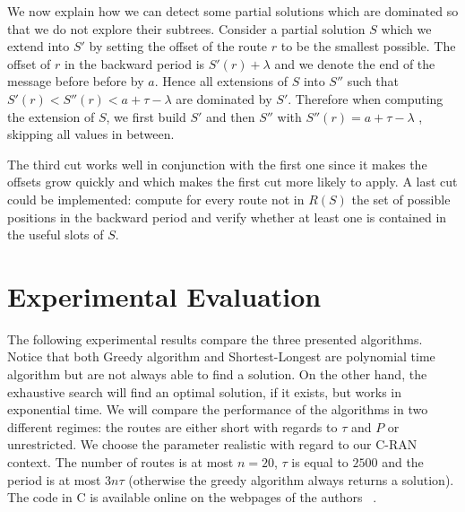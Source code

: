 \documentclass[a4paper,10pt]{article}
\newcommand{\todo}[1]{{\color{red} TODO: {#1}}}
\begin{document}
\begin{enumerate}
       We now explain how we can detect some partial solutions which are dominated so that we do not explore their subtrees.
       Consider a partial solution $S$ which we extend into $S'$ by setting the offset of the route $r$ to be the smallest possible. The offset of $r$ in the backward period is $S'(r)+ \lambda$ and we denote the end of the message before before by $a$. Hence all extensions of $S$ into $S''$ such that $S'(r)  < S''(r) < a + \tau - \lambda$ are dominated by $S'$. Therefore when computing the extension of $S$, we first build $S'$ and then $S''$ with $S''(r) =  a + \tau - \lambda$ , skipping all values in between.
       
       \end{enumerate}
      
      The third cut works well in conjunction with the first one since it makes the offsets grow quickly and 
      which makes the first cut more likely to apply. A last cut could be implemented: compute for every route not in $R(S)$ the set of possible positions in the backward period and verify whether at least one is contained in the useful slots of $S$.


    \section{Experimental Evaluation}\label{sec:exp_PAZL}
      
      The following experimental results compare the three presented algorithms.
      Notice that both Greedy algorithm and Shortest-Longest are polynomial time algorithm but are not always able to find a solution. On the other hand, the exhaustive search will find an optimal solution, if it exists, but works in exponential time. We will compare the performance of the algorithms in two different regimes: the routes are either short with regards to $\tau$ and $P$ or unrestricted.
      We choose the parameter realistic with regard to our C-RAN context. The number of routes 
      is at most $n = 20$, $\tau$ is equal to $2500$ and the period is at most $3n\tau$ (otherwise the greedy algorithm always returns a solution). The code in C is available online on the webpages of the authors ~\cite{webpage}.
%             
% 
\end{document}
